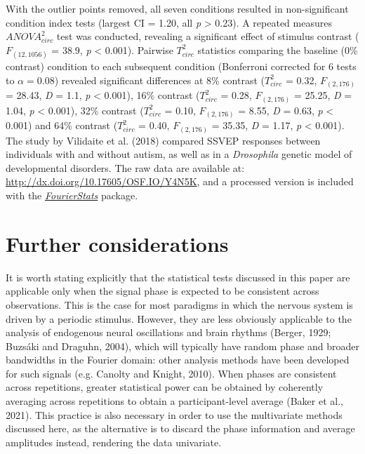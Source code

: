 \documentclass[]{article}
\begin{document}
With the outlier points removed, all seven conditions resulted in non-significant condition index tests (largest CI = 1.20, all \emph{p} \textgreater{} 0.23). A repeated measures \(ANOVA^2_{circ}\) test was conducted, revealing a significant effect of stimulus contrast (\(F_{(12,1056)}\) = 38.9, \emph{p} \textless{} 0.001). Pairwise \(T^2_{circ}\) statistics comparing the baseline (0\% contrast) condition to each subsequent condition (Bonferroni corrected for 6 tests to \(\alpha = 0.08\)) revealed significant differences at 8\% contrast (\(T^2_{circ}\) = 0.32, \(F_{(2,176)}\) = 28.43, \emph{D} = 1.1, \emph{p} \textless{} 0.001), 16\% contrast (\(T^2_{circ}\) = 0.28, \(F_{(2,176)}\) = 25.25, \emph{D} = 1.04, \emph{p} \textless{} 0.001), 32\% contrast (\(T^2_{circ}\) = 0.10, \(F_{(2,176)}\) = 8.55, \emph{D} = 0.63, \emph{p} \textless{} 0.001) and 64\% contrast (\(T^2_{circ}\) = 0.40, \(F_{(2,176)}\) = 35.35, \emph{D} = 1.17, \emph{p} \textless{} 0.001). The study by Vilidaite et al. (2018) compared SSVEP responses between individuals with and without autism, as well as in a \emph{Drosophila} genetic model of developmental disorders. The raw data are available at: \url{http://dx.doi.org/10.17605/OSF.IO/Y4N5K}, and a processed version is included with the \href{https://github.com/bakerdh/FourierStats}{\emph{FourierStats}} package.

\hypertarget{further-considerations}{%
\section{Further considerations}\label{further-considerations}}

It is worth stating explicitly that the statistical tests discussed in this paper are applicable only when the signal phase is expected to be consistent across observations. This is the case for most paradigms in which the nervous system is driven by a periodic stimulus. However, they are less obviously applicable to the analysis of endogenous neural oscillations and brain rhythms (Berger, 1929; Buzsáki and Draguhn, 2004), which will typically have random phase and broader bandwidths in the Fourier domain: other analysis methods have been developed for such signals (e.g. Canolty and Knight, 2010). When phases are consistent across repetitions, greater statistical power can be obtained by coherently averaging across repetitions to obtain a participant-level average (Baker et al., 2021). This practice is also necessary in order to use the multivariate methods discussed here, as the alternative is to discard the phase information and average amplitudes instead, rendering the data univariate.
\end{document}
